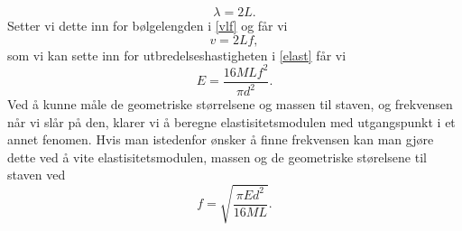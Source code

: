 \documentclass[%
 reprint,
 amsmath,amssymb,
 aps,
]{revtex4-1}
\begin{document}
\begin{equation}
  \lambda = 2L.
\end{equation}
Setter vi dette inn for bølgelengden i \eqref{vlf} og får vi
\begin{equation*}
  v = 2Lf,
\end{equation*}
som vi kan sette inn for utbredelseshastigheten i \eqref{elast} får vi
\begin{equation}
  E = \frac{16MLf^2}{\pi d^2}. \label{young5}
\end{equation}
Ved å kunne måle de geometriske størrelsene og massen til staven, og frekvensen når vi slår på den, klarer vi å beregne elastisitetsmodulen med utgangspunkt i et annet fenomen. Hvis man istedenfor ønsker å finne frekvensen kan man gjøre dette ved å vite elastisitetsmodulen, massen og de geometriske størelsene til staven ved
\begin{equation}
  f = \sqrt{\frac{\pi E d^2}{16ML}}. \label{young6}
\end{equation}
\end{document}
